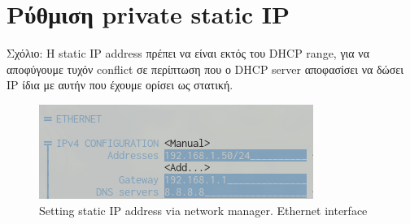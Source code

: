 \documentclass[12pt, a4paper]{article}
\begin{document}
\pagebreak
\section{Ρύθμιση private static IP}

Σχόλιο: Η static IP address πρέπει να είναι εκτός του DHCP range, για να αποφύγουμε τυχόν conflict σε περίπτωση που ο DHCP server αποφασίσει να δώσει IP ίδια με αυτήν που έχουμε ορίσει ως στατική.

\begin{figure}[h!]
    \centering
    \includegraphics[height=.3\textheight, width=\textwidth, keepaspectratio]{assets/router/static.png}
    \caption{Setting static IP address via network manager. Ethernet interface} 
    \label{fig:static}
\end{figure}
\end{document}
